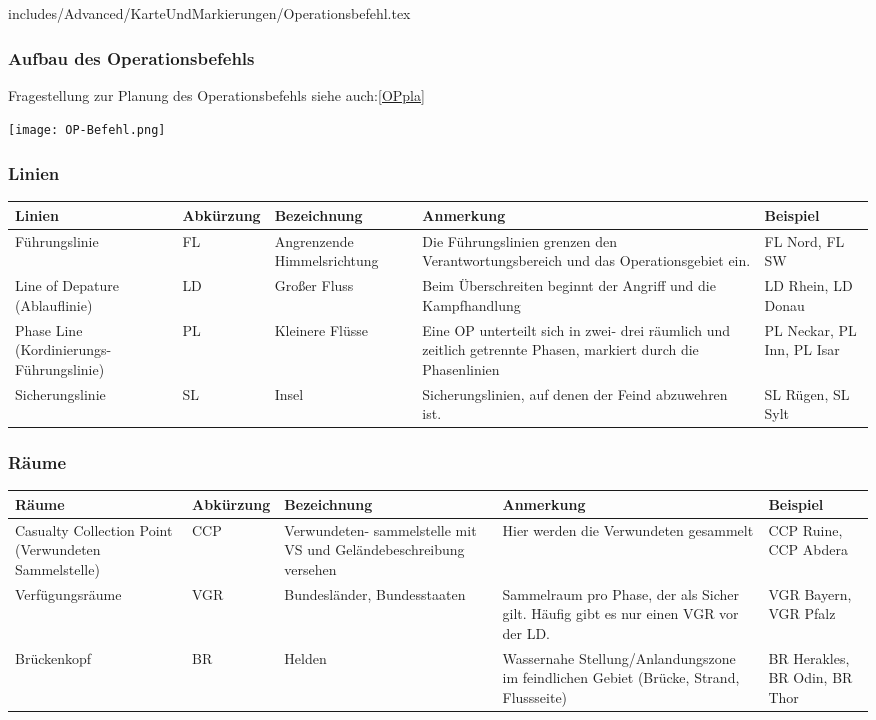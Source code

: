 \newpage

includes/Advanced/KarteUndMarkierungen/Operationsbefehl.tex
\subsubsection{Aufbau des Operationsbefehls}
\label{OPbef}
Fragestellung zur Planung des Operationsbefehls siehe auch:\ref{OPpla}

\begin{minipage}[t]{1\textwidth}
	\texttt{[image: OP-Befehl.png]}
\end{minipage}

\subsubsection{Linien}
\begin{longtable}{|p{3cm}|p{}|p{}|p{4cm}|p{}|} 																											\hline
	Linien				&		Abkürzung			&		Bezeichnung				&			Anmerkung 									&		Beispiel 			\\ \hline
	Führungslinie			&		FL				&		Angrenzende Himmelsrichtung	&			Die Führungslinien grenzen \newline den Verantwortungsbereich und \newline das Operationsgebiet ein. & FL Nord, FL SW \\ \hline
	Line of Depature (Ablauflinie)&		LD				&		Großer Fluss				&			Beim Überschreiten beginnt der Angriff und die Kampfhandlung 	&	LD Rhein, LD Donau			\\ \hline
	Phase Line (Kordinierungs-Führungslinie) & PL				&		Kleinere Flüsse			&			Eine OP unterteilt sich in zwei- drei räumlich und zeitlich getrennte Phasen, markiert durch die Phasenlinien	& PL Neckar, PL Inn, PL Isar	\\ \hline
	Sicherungslinie 		&		SL 				&		Insel					&			Sicherungslinien, auf denen der Feind abzuwehren ist.		&	SL Rügen, SL Sylt			\\ \hline
\end{longtable}

\subsubsection{Räume}
\begin{longtable}{|p{3cm}|p{}|p{}|p{4cm}|p{}|} 																											\hline
	Räume			&		Abkürzung			&		Bezeichnung				&			Anmerkung 									&		Beispiel 			\\ \hline
	Casualty Collection Point (Verwundeten Sammelstelle) & CCP	& 		Verwundeten- sammelstelle mit VS und Geländebeschreibung versehen & Hier werden die Verwundeten gesammelt		& 		CCP Ruine, CCP Abdera	\\ \hline
	Verfügungsräume		&		VGR				&		Bundesländer, Bundesstaaten	&			Sammelraum pro Phase, der als Sicher gilt. Häufig gibt es nur einen VGR vor der LD. 	&	VGR Bayern, VGR Pfalz \\ \hline
	Brückenkopf			&		BR				&		Helden				&			Wassernahe Stellung/Anlandungszone  im feindlichen Gebiet (Brücke, Strand, Flussseite)	& BR Herakles, BR Odin, BR Thor \\ \hline
\end{longtable}

